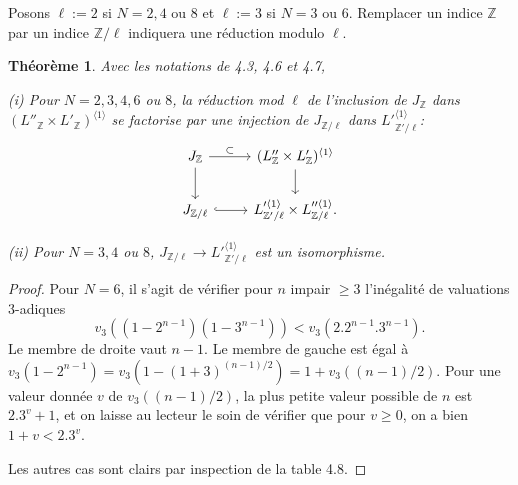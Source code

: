 \documentclass[11pt,a4paper]{article}
\theoremstyle{plain}
\newtheorem{theorem}{Th\'eor\`eme}[section]
\theoremstyle{definition}
\newcommand{\Z}{\mathbb{Z}}
\begin{document}
Posons $\ell := 2$ si $N=2,4$ ou $8$ et $\ell := 3$ si $N=3$ ou $6$. Remplacer un indice $\Z$ par un indice $\Z/\ell$ indiquera une r\'eduction modulo $\ell$.

\begin{theorem}\label{thm:4.9}
Avec les notations de 4.3, 4.6 et 4.7,

\emph{(i)} Pour $N=2,3,4,6$ ou $8$, la r\'eduction mod $\ell$ de l'inclusion de $J_\Z$ dans $(L''_\Z \times L'_\Z)^{\langle 1 \rangle}$ se factorise par une injection de $J_{\Z/\ell}$ dans $L'^{\langle 1 \rangle}_{\Z'/\ell}$:
\begin{equation}\label{eq:4.9.1}
\begin{tikzcd}
J_\Z \arrow{r}{\subset} \arrow{d} & (L''_\Z \times L'_\Z)^{\langle 1 \rangle} \arrow{d} \\
J_{\Z/\ell} \arrow[hook]{r} & L'^{\langle 1 \rangle}_{\Z'/\ell} \times L''^{\langle 1 \rangle}_{\Z/\ell}.
\end{tikzcd}
\end{equation}

\emph{(ii)} Pour $N=3,4$ ou $8$, $J_{\Z/\ell} \to L'^{\langle 1 \rangle}_{\Z'/\ell}$ est un isomorphisme.
\end{theorem}

\begin{proof}
Pour $N=6$, il s'agit de v\'erifier pour $n$ impair $\geq 3$ l'in\'egalit\'e de valuations $3$-adiques
\[
v_3((1-2^{n-1})(1-3^{n-1})) < v_3(2.2^{n-1}.3^{n-1}).
\]
Le membre de droite vaut $n-1$. Le membre de gauche est \'egal \`a $v_3(1-2^{n-1}) = v_3(1-(1+3)^{(n-1)/2}) = 1+v_3((n-1)/2)$. Pour une valeur donn\'ee $v$ de $v_3((n-1)/2)$, la plus petite valeur possible de $n$ est $2.3^v+1$, et on laisse au lecteur le soin de v\'erifier que pour $v \geq 0$, on a bien $1+v < 2.3^v$.

Les autres cas sont clairs par inspection de la table 4.8.
\end{proof}
\end{document}
